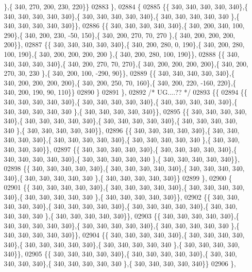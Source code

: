 \begin{DoxyCode}
      \},\{ 340, 270, 200, 230, 220\}\}
02883 \},
02884 \{
02885 \{\{ 340, 340, 340, 340, 340\},\{ 340, 340, 340, 340, 340\},\{ 340, 340, 340, 340, 340\},\{ 340, 340, 340, 340, 340
      \},\{ 340, 340, 340, 340, 340\}\},
02886 \{\{ 340, 340, 340, 340, 340\},\{ 340, 200, 340, 100, 290\},\{ 340, 200, 230, -50, 150\},\{ 340, 200, 270,  70, 270
      \},\{ 340, 200, 200, 200, 200\}\},
02887 \{\{ 340, 340, 340, 340, 340\},\{ 340, 200, 280,   0, 190\},\{ 340, 200, 280, 100, 190\},\{ 340, 200, 200, 200, 200
      \},\{ 340, 200, 280, 100, 190\}\},
02888 \{\{ 340, 340, 340, 340, 340\},\{ 340, 200, 270,  70, 270\},\{ 340, 200, 200, 200, 200\},\{ 340, 200, 270,  30, 230
      \},\{ 340, 200, 100, -290,  90\}\},
02889 \{\{ 340, 340, 340, 340, 340\},\{ 340, 200, 200, 200, 200\},\{ 340, 200, 250,  70, 160\},\{ 340, 200, 220, -160, 
      220\},\{ 340, 200, 190,  90, 110\}\}
02890 \}
02891 \},
02892 \textcolor{comment}{/* UG....?? */}
02893 \{\{
02894 \{\{ 340, 340, 340, 340, 340\},\{ 340, 340, 340, 340, 340\},\{ 340, 340, 340, 340, 340\},\{ 340, 340, 340, 340, 340
      \},\{ 340, 340, 340, 340, 340\}\},
02895 \{\{ 340, 340, 340, 340, 340\},\{ 340, 340, 340, 340, 340\},\{ 340, 340, 340, 340, 340\},\{ 340, 340, 340, 340, 340
      \},\{ 340, 340, 340, 340, 340\}\},
02896 \{\{ 340, 340, 340, 340, 340\},\{ 340, 340, 340, 340, 340\},\{ 340, 340, 340, 340, 340\},\{ 340, 340, 340, 340, 340
      \},\{ 340, 340, 340, 340, 340\}\},
02897 \{\{ 340, 340, 340, 340, 340\},\{ 340, 340, 340, 340, 340\},\{ 340, 340, 340, 340, 340\},\{ 340, 340, 340, 340, 340
      \},\{ 340, 340, 340, 340, 340\}\},
02898 \{\{ 340, 340, 340, 340, 340\},\{ 340, 340, 340, 340, 340\},\{ 340, 340, 340, 340, 340\},\{ 340, 340, 340, 340, 340
      \},\{ 340, 340, 340, 340, 340\}\}
02899 \},
02900 \{
02901 \{\{ 340, 340, 340, 340, 340\},\{ 340, 340, 340, 340, 340\},\{ 340, 340, 340, 340, 340\},\{ 340, 340, 340, 340, 340
      \},\{ 340, 340, 340, 340, 340\}\},
02902 \{\{ 340, 340, 340, 340, 340\},\{ 340, 340, 340, 340, 340\},\{ 340, 340, 340, 340, 340\},\{ 340, 340, 340, 340, 340
      \},\{ 340, 340, 340, 340, 340\}\},
02903 \{\{ 340, 340, 340, 340, 340\},\{ 340, 340, 340, 340, 340\},\{ 340, 340, 340, 340, 340\},\{ 340, 340, 340, 340, 340
      \},\{ 340, 340, 340, 340, 340\}\},
02904 \{\{ 340, 340, 340, 340, 340\},\{ 340, 340, 340, 340, 340\},\{ 340, 340, 340, 340, 340\},\{ 340, 340, 340, 340, 340
      \},\{ 340, 340, 340, 340, 340\}\},
02905 \{\{ 340, 340, 340, 340, 340\},\{ 340, 340, 340, 340, 340\},\{ 340, 340, 340, 340, 340\},\{ 340, 340, 340, 340, 340
      \},\{ 340, 340, 340, 340, 340\}\}
02906 \},

\end{DoxyCode}
